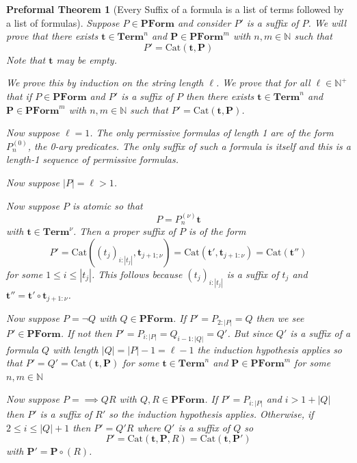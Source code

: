 \documentclass[oneside, 12pt]{book}
\theoremstyle{break}
\newtheorem{preformal definition}[definition]{Preformal Definition}
\newtheorem{preformal theorem}[theorem]{Preformal Theorem}
\newcommand{\bv}[1]{\boldsymbol{#1}}
\newcommand{\N}[0]{\mathbb{N}}
\newcommand{\norm}[1]{\left|#1\right|}
\begin{document}
		\begin{preformal theorem}[Every Suffix of a formula is a list of terms followed by a list of formulas]
			Suppose $P \in \textbf{PForm}$ and consider $P'$ is a suffix of $P$.
			We will prove that there exists $\bv{t} \in \textbf{Term}^n$ and $\bv{P} \in \textbf{PForm}^m$ with $n, m \in \mathbb{N}$ such that
			\begin{equation*}
				P' = \text{Cat}(\bv{t}, \bv{P})
			\end{equation*}
			Note that $\bv{t}$ may be empty.
			
			We prove this by induction on the string length $\ell$.
			We prove that for all $\ell \in \N^+$ that if $P \in \textbf{PForm}$ and $P'$ is a suffix of $P$ then there exists $\bv{t}\in \textbf{Term}^n$ and $\bv{P} \in \textbf{PForm}^m$ with $n, m \in \N$ such that $P' = \text{Cat}(\bv{t}, \bv{P})$.
			
			Now suppose $\ell = 1$.
			The only permissive formulas of length 1 are of the form $P_n^{(0)}$, the 0-ary predicates.
			The only suffix of such a formula is itself and this is a length-1 sequence of permissive formulas.
			
			Now suppose $\norm{P} = \ell > 1$.
			
			Now suppose $P$ is atomic so that
			\begin{equation*}
				P = P_n^{(\nu)}\bv{t}
			\end{equation*}
			with $\bv{t} \in \textbf{Term}^{\nu}$.
			Then a proper suffix of $P$ is of the form
			\begin{equation*}
				P' = \text{Cat}((t_j)_{i:\norm{t_j}}, \bv{t}_{j+1;\nu}) = \text{Cat}(\bv{t}', \bv{t}_{j+1:\nu}) = \text{Cat}(\bv{t}'')
			\end{equation*}
			for some $1 \le i \le \norm{t_j}$.
			This follows because $(t_j)_{i:\norm{t_j}}$ is a suffix of $t_j$ and $\bv{t}'' = \bv{t}'\circ \bv{t}_{j+1:\nu}$.
			
			Now suppose $P = \lnot Q$ with $Q \in \textbf{PForm}$.
			If $P' = P_{2:\norm{P}} = Q$ then we see $P' \in \textbf{PForm}$.
			If not then $P' = P_{i:\norm{P}} = Q_{i-1:\norm{Q}} = Q'$.
			But since $Q'$ is a suffix of a formula $Q$ with length $\norm{Q} = \norm{P}-1 = \ell - 1$ the induction hypothesis applies so that $P' = Q' = \text{Cat}(\bv{t}, \bv{P})$ for some $\bv{t} \in \textbf{Term}^n$ and $\bv{P} \in \textbf{PForm}^m$ for some $n, m \in \N$
			
			Now suppose $P = \implies QR$ with $Q, R \in \textbf{PForm}$.
			If $P' = P_{i:\norm{P}}$ and $i>1 + \norm{Q}$ then $P'$ is a suffix of $R'$ so the induction hypothesis applies.
			Otherwise, if $2\le i \le \norm{Q}+1$ then $P' = Q'R$ where $Q'$ is a suffix of $Q$ so
			\begin{equation*}
				P' = \text{Cat}(\bv{t}, \bv{P}, R) = \text{Cat}(\bv{t}, \bv{P}')
			\end{equation*}
			with $\bv{P}' = \bv{P} \circ (R)$.
			

\end{preformal theorem}
\end{document}
